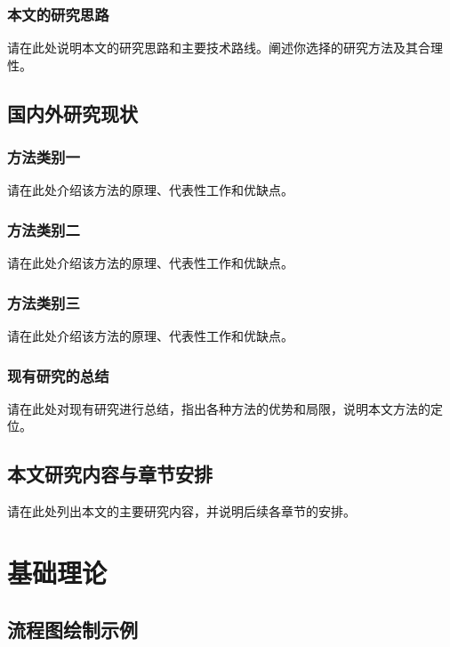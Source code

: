 \documentclass[supercite]{HustGraduPaper}
\begin{document}
	\subsubsection{本文的研究思路}
	
	请在此处说明本文的研究思路和主要技术路线。阐述你选择的研究方法及其合理性。
	
	\subsection{国内外研究现状}
	
	\subsubsection{方法类别一}
	
	请在此处介绍该方法的原理、代表性工作和优缺点。
	
	\subsubsection{方法类别二}
	
	请在此处介绍该方法的原理、代表性工作和优缺点。
	
	\subsubsection{方法类别三}
	
	请在此处介绍该方法的原理、代表性工作和优缺点。
	
	\subsubsection{现有研究的总结}
	
	请在此处对现有研究进行总结，指出各种方法的优势和局限，说明本文方法的定位。
	
	\subsection{本文研究内容与章节安排}
	
	请在此处列出本文的主要研究内容，并说明后续各章节的安排。
	
	\section{基础理论}
	
	\subsection{流程图绘制示例}
	
\end{document}
